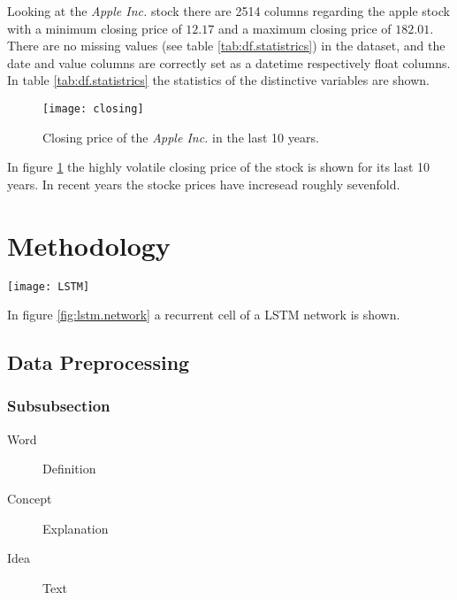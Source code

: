 \documentclass[fleqn,10pt]{SelfArx} %
\begin{document}
Looking at the \textit{Apple Inc.} stock there are 2514 columns regarding the apple stock with a minimum closing price of $12.17$ and a maximum closing price of $182.01$. There are no missing values (see table \ref{tab:df.statistrics}) in the dataset, and the date and value columns are correctly set as a datetime respectively float columns. In table \ref{tab:df.statistrics} the statistics of the distinctive variables are shown.

\begin{figure}[ht]\centering
	\texttt{[image: closing]}
	\caption{Closing price of the \textit{Apple Inc.} in the last 10 years.}
	\label{fig:results}
\end{figure}

In figure \ref{fig:results} the highly volatile closing price of the stock is shown for its last 10 years. In recent years the stocke prices have incresead roughly sevenfold. 





\section{Methodology}

\begin{figure*}[ht]\centering %
	\texttt{[image: LSTM]}
	\caption{The reccurent cell of a LSTM network.\cite{LSTM}}
	\label{fig:lstm.network}
\end{figure*}
In figure \ref{fig:lstm.network} a recurrent cell of a LSTM network is shown.


\subsection{Data Preprocessing}

\lipsum[11] %



\subsubsection{Subsubsection}

\lipsum[12] %

\begin{description}
	\item[Word] Definition
	\item[Concept] Explanation
	\item[Idea] Text
\end{description}
\end{document}
